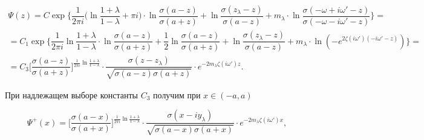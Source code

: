 \begin{multline*}


\Psi(z)=C\exp\bigg\{\dfrac{1}{2\pi i}


\bigg(\ln\dfrac{1+\lambda}{1-\lambda}+\pi i\bigg)


\cdot\ln\dfrac{\sigma(a-z)}{\sigma(a+z)}+


\ln\dfrac{\sigma(z_{\lambda}-z)}{\sigma(a-z)}+m_{\lambda}\cdot


\ln\dfrac{\sigma(-\omega+i\omega'-z)}


{\sigma(-\omega-i\omega'-z)}\bigg\}= \\


%


=C_{1}\exp\bigg\{\dfrac{1}{2\pi i}


\ln\dfrac{1+\lambda}{1-\lambda}\cdot


\ln\dfrac{\sigma(a-z)}{\sigma(a+z)}+


\dfrac{1}{2}\ln\dfrac{\sigma(a-z)}{\sigma(a+z)}+


\ln\dfrac{\sigma(z_{\lambda}-z)}{\sigma(a-z)}+


m_{\lambda}\cdot\ln(-e^{2\zeta(i\omega')


(-i\omega'-z)})\bigg\}= \\


%


=C_{3}\bigg[\dfrac{\sigma(a-z)}{\sigma(a+z)}\bigg]


^{\frac{1}{2\pi i}\ln\frac{1+\lambda}{1-\lambda}}


\cdot\dfrac{\sigma(z-z_{\lambda})}


{\sqrt{\sigma(a-z)\sigma(a+z)}}\cdot


e^{-2m_{\lambda}\zeta(i\omega')z}.


\end{multline*}


При надлежащем выборе константы $C_{3}$ получим при $x\in(-a,a)$


\begin{equation}


\Psi^{+}(x)=


\bigg[\dfrac{\sigma(a-x)}{\sigma(a+x)}\bigg]


^{\frac{1}{2\pi i}\ln\frac{1+\lambda}{1-\lambda}}


\cdot\dfrac{\sigma(x-iy_{\lambda})}


{\sqrt{\sigma(a-x)\sigma(a+x)}}\cdot


e^{-2m_{\lambda}\zeta(i\omega')x},


\end{equation}


